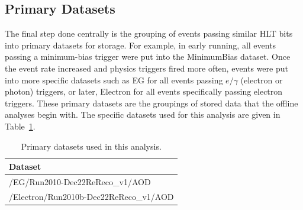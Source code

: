 



\subsection{Primary Datasets}
\label{evSel:PD}
The final step done centrally is the grouping of events passing similar 
HLT bits into primary datasets for storage.  
For example, in early running, all events passing a minimum-bias trigger 
were put into the MinimumBias dataset.  
Once the event rate increased and physics triggers fired more often, 
events were put into more specific datasets such as 
EG for all events passing $e/\gamma$ (electron or photon) triggers, 
or later, Electron for all events specifically passing 
electron triggers.  
These primary datasets are the groupings of stored data 
that the offline analyses begin with.  
The specific datasets used for this analysis are given in 
Table~\ref{TableDatasets}.  

\begin{table}[htbp]
  \begin{center}
    \caption{\fixspacing Primary datasets used in this analysis.}
    \label{TableDatasets}
    \begin{tabular}[]{ | l | }
      \hline
      Dataset  \\ \hline \hline
      /EG/Run2010-Dec22ReReco\_v1/AOD  \\ \hline
      /Electron/Run2010b-Dec22ReReco\_v1/AOD  \\ \hline
    \end{tabular}
  \end{center}
\end{table}

